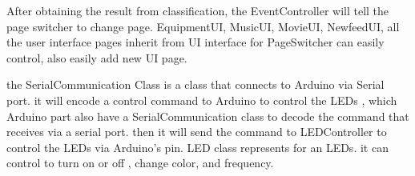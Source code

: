 After obtaining the result from classification, the EventController will tell the page switcher to change page. EquipmentUI, MusicUI, MovieUI, NewfeedUI, all the user interface pages inherit from UI interface for PageSwitcher can easily control, also easily add new UI page.

the SerialCommunication Class is a class that connects to Arduino via Serial port. it will encode a control command to Arduino to control the LEDs , which Arduino part also have a SerialCommunication class to decode the command that receives via a serial port. then it will send the command to LEDController to control the LEDs via Arduino's pin. LED class represents for an LEDs. it can control to turn on or off , change color, and frequency.